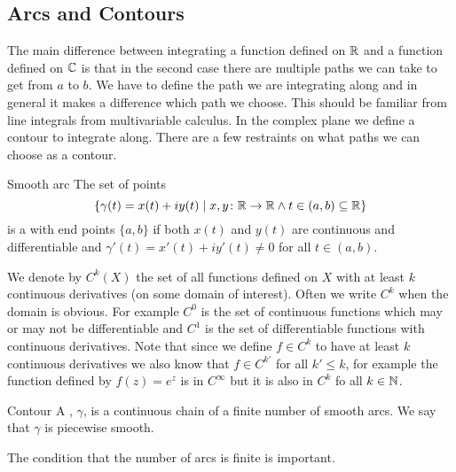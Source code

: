 \documentclass{article}
\newcommand{\st}{\mid}
\begin{document}
    \subsection{Arcs and Contours}
    The main difference between integrating a function defined on \(\mathbb{R}\) and a function defined on \(\mathbb{C}\) is that in the second case there are multiple paths we can take to get from \(a\) to \(b\).
    We have to define the path we are integrating along and in general it makes a difference which path we choose.
    This should be familiar from line integrals from multivariable calculus.
    In the complex plane we define a contour to integrate along.
    There are a few restraints on what paths we can choose as a contour.
    \begin{definition}{Smooth arc}{}
        The set of points
        \[\{\gamma(t) = x(t) + iy(t) \st x, y\colon\reals\to\reals\wedge t\in(a, b)\subseteq\reals\}\]
        is a  with end points \(\{a, b\}\) if both \(x(t)\) and \(y(t)\) are continuous and differentiable and \(\gamma'(t) = x'(t) + iy'(t) \ne 0\) for all \(t\in(a, b)\).
    \end{definition}
    \begin{notation*}{}
        We denote by \(C^k(X)\) the set of all functions defined on \(X\) with at least \(k\) continuous derivatives (on some domain of interest).
        Often we write \(C^k\) when the domain is obvious.
        For example \(C^0\) is the set of continuous functions which may or may not be differentiable and \(C^1\) is the set of differentiable functions with continuous derivatives. 
        Note that since we define \(f\in C^k\) to have at least \(k\) continuous derivatives we also know that \(f\in C^{k'}\) for all \(k'\le k\), for example the function defined by \(f(z) = e^z\) is in \(C^{\infty}\) but it is also in \(C^k\) fo all \(k\in\mathbb{N}\).
    \end{notation*}
    \begin{definition}{Contour}{}
        A , \(\gamma\), is a continuous chain of a finite number of smooth arcs.
        We say that \(\gamma\) is piecewise smooth.
    \end{definition}
    The condition that the number of arcs is finite is important.
\end{document}
